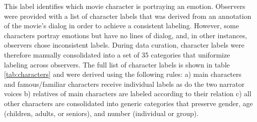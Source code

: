 \documentclass[10pt,a4paper,twocolumn]{article}
\begin{document}
This label identifies which movie character is portraying an emotion. Observers
were provided with a list of character labels that was derived from an
annotation of the movie's dialog in order to achieve a consistent labeling.
However, some characters portray emotions but have no lines of dialog, and, in
other instances, observers chose inconsistent labels. During data curation,
character labels were therefore manually consolidated into a set of 35
categories that uniformize labeling across observers. The full list of character
labels is shown in table \ref{tab:characters} and were derived using the
following rules: a) main characters and famous/familiar characters receive
individual labels as do the two narrator voices b) relatives of main characters
are labeled according to their relation c) all other characters are consolidated
into generic categories that preserve gender, age (children, adults, or
seniors), and number (individual or group).
\end{document}
